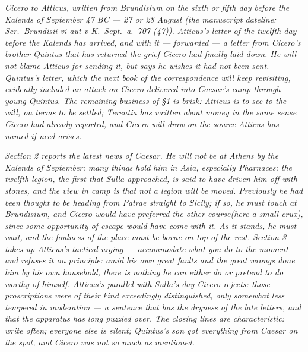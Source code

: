 
\textit{Cicero to Atticus, written from Brundisium on
the sixth or fifth day before the Kalends of September
47 BC --- 27 or 28 August (the manuscript dateline:
\textit{Scr.\ Brundisii vi aut v K.\ Sept.\ a.\ 707
(47)}). Atticus's letter of the twelfth day before the
Kalends has arrived, and with it --- forwarded ---
a letter from Cicero's brother Quintus that has
returned the grief Cicero had finally laid down. He
will not blame Atticus for sending it, but says he
wishes it had not been sent. Quintus's letter, which
the next book of the correspondence will keep
revisiting, evidently included an attack on Cicero
delivered into Caesar's camp through young Quintus.
The remaining business of \S1 is brisk: Atticus is to
see to the will, on terms to be settled; Terentia has
written about money in the same sense Cicero had
already reported, and Cicero will draw on the source
Atticus has named if need arises.}

\textit{Section 2 reports the latest news of Caesar.
He will not be at Athens by the Kalends of September;
many things hold him in Asia, especially Pharnaces;
the twelfth legion, the first that Sulla approached,
is said to have driven him off with stones, and the
view in camp is that not a legion will be moved.
Previously he had been thought to be heading from
Patrae straight to Sicily; if so, he must touch at
Brundisium, and Cicero would have preferred the
\dag other course\dag (here a small crux), since some
opportunity of escape would have come with it. As it
stands, he must wait, and the foulness of the place
must be borne on top of the rest. Section 3 takes up
Atticus's tactical urging --- accommodate what you do
to the moment --- and refuses it on principle: amid
his own great faults and the great wrongs done him by
his own household, there is nothing he can either do
or pretend to do worthy of himself. Atticus's
parallel with Sulla's day Cicero rejects: those
proscriptions were of their kind exceedingly
distinguished, only somewhat less tempered in
moderation --- a sentence that has the dryness of the
late letters, and that the apparatus has long puzzled
over. The closing lines are characteristic: write
often; everyone else is silent; Quintus's son got
everything from Caesar on the spot, and Cicero was
not so much as mentioned.}
